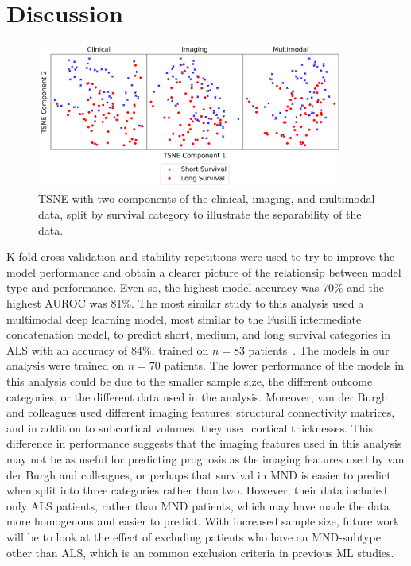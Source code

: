 \section{Discussion}

\begin{figure}
    \centering
    \includegraphics[width=0.9\textwidth]{figures/tsne_plot}
    \caption{TSNE with two components of the clinical, imaging, and multimodal data, split by survival category to illustrate the separability of the data.}
    \label{fig:tsne}
\end{figure}

K-fold cross validation and stability repetitions were used to try to improve the model performance and obtain a clearer picture of the relationsip between model type and performance.
Even so, the highest model accuracy was 70\% and the highest AUROC was 81\%.
The most similar study to this analysis used a multimodal deep learning model, most similar to the Fusilli intermediate concatenation model, to predict short, medium, and long survival categories in ALS with an accuracy of 84\%, trained on $n=83$ patients~\cite{vanderburghDeepLearningPredictions2017}.
The models in our analysis were trained on $n=70$ patients.
The lower performance of the models in this analysis could be due to the smaller sample size, the different outcome categories, or the different data used in the analysis.
Moreover, van der Burgh and colleagues used different imaging features: structural connectivity matrices, and in addition to subcortical volumes, they used cortical thicknesses.
This difference in performance suggests that the imaging features used in this analysis may not be as useful for predicting prognosis as the imaging features used by van der Burgh and colleagues, or perhaps that survival in MND is easier to predict when split into three categories rather than two.
However, their data included only ALS patients, rather than MND patients, which may have made the data more homogenous and easier to predict.
With increased sample size, future work will be to look at the effect of excluding patients who have an MND-subtype other than ALS, which is an common exclusion criteria in previous ML studies.

